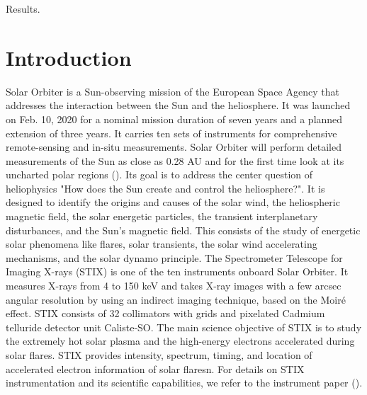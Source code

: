 \documentclass{aa}
\begin{document}
   {Results.}
   {}


   \maketitle
%

\section{Introduction}
Solar Orbiter is a Sun-observing mission of the European Space  Agency that 
addresses the interaction between the Sun and the heliosphere.
It was launched on Feb. 10, 2020 for a nominal mission duration of seven years and a planned 
extension of
three years. It carries ten sets of instruments for comprehensive
remote-sensing and in-situ measurements. 
Solar Orbiter  will perform detailed measurements of the Sun as close as 0.28 AU and for the first time look at its uncharted polar regions (\cite{SolarOrbiter2020}).  
Its goal is to  address the center question of heliophysics  "How does the Sun create and control the heliosphere?".  It is designed to identify the origins and causes of the solar wind, the heliospheric magnetic field, the solar energetic particles, the transient interplanetary disturbances, and the Sun's magnetic field.
This consists of the study of energetic solar phenomena like flares,  solar transients,  the solar wind accelerating mechanisms, and the solar dynamo principle.  
The Spectrometer Telescope for Imaging X-rays (STIX) is one of the ten instruments onboard Solar Orbiter.  
It measures X-rays from 4 to 150 keV and takes X-ray images with a few arcsec angular resolution by using an indirect imaging technique,
based on the Moiré effect.  STIX consists of 32 collimators with grids and pixelated Cadmium telluride detector unit Caliste-SO. 
The main science objective of STIX is to study the extremely hot solar plasma and the high-energy electrons accelerated during solar flares. STIX provides  intensity,  spectrum, timing, and location of accelerated electron information of solar flaresn.
For details on STIX instrumentation and its scientific capabilities, we refer to the instrument paper (\cite{StixInstrument}).
\end{document}
